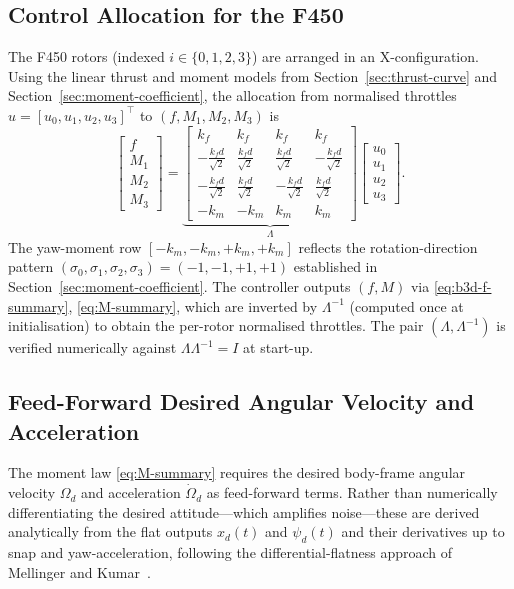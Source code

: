 \documentclass[11pt]{article}
\theoremstyle{remark}
\begin{document}
\subsection{Control Allocation for the F450}
\label{sec:alloc}
The F450 rotors (indexed $i \in \{0, 1, 2, 3\}$) are arranged in an X-configuration. Using the linear thrust and moment models from Section~\ref{sec:thrust-curve} and Section~\ref{sec:moment-coefficient}, the allocation from normalised throttles $u = [u_0, u_1, u_2, u_3]^\top$ to $(f, M_1, M_2, M_3)$ is
\begin{equation}
    \begin{bmatrix} f \\ M_1 \\ M_2 \\ M_3 \end{bmatrix}
    =
    \underbrace{
    \begin{bmatrix}
        k_f & k_f & k_f & k_f \\
       -\frac{k_f d}{\sqrt{2}} &  \frac{k_f d}{\sqrt{2}} &  \frac{k_f d}{\sqrt{2}} & -\frac{k_f d}{\sqrt{2}} \\
       -\frac{k_f d}{\sqrt{2}} &  \frac{k_f d}{\sqrt{2}} & -\frac{k_f d}{\sqrt{2}} &  \frac{k_f d}{\sqrt{2}} \\
       -k_m & -k_m & k_m & k_m
    \end{bmatrix}}_{\Lambda}
    \begin{bmatrix} u_0 \\ u_1 \\ u_2 \\ u_3 \end{bmatrix}.
\end{equation}
The yaw-moment row $[-k_m, -k_m, +k_m, +k_m]$ reflects the rotation-direction pattern $(\sigma_0, \sigma_1, \sigma_2, \sigma_3) = (-1, -1, +1, +1)$ established in Section~\ref{sec:moment-coefficient}. The controller outputs $(f, M)$ via \eqref{eq:b3d-f-summary}, \eqref{eq:M-summary}, which are inverted by $\Lambda^{-1}$ (computed once at initialisation) to obtain the per-rotor normalised throttles. The pair $(\Lambda, \Lambda^{-1})$ is verified numerically against $\Lambda \Lambda^{-1} = I$ at start-up.

\subsection{Feed-Forward Desired Angular Velocity and Acceleration}
\label{sec:feedforward}

The moment law \eqref{eq:M-summary} requires the desired body-frame angular velocity $\Omega_d$ and acceleration $\dot\Omega_d$ as feed-forward terms. Rather than numerically differentiating the desired attitude---which amplifies noise---these are derived analytically from the flat outputs $x_d(t)$ and $\psi_d(t)$ and their derivatives up to snap and yaw-acceleration, following the differential-flatness approach of Mellinger and Kumar~\cite{Mellinger2011}.
\end{document}
